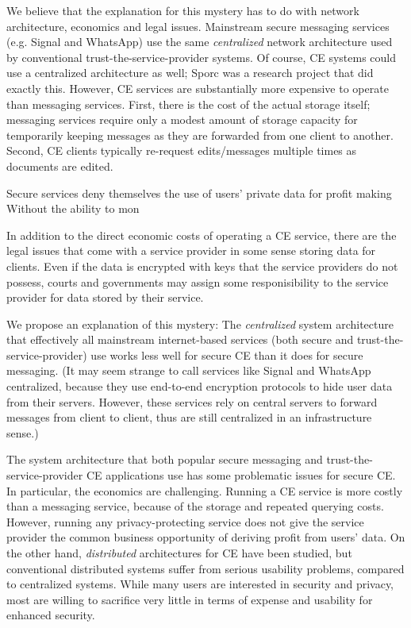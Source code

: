\documentclass[runningheads]{llncs}
\begin{document}
We believe that the explanation for this mystery has to do with network architecture, economics and legal issues.
Mainstream secure messaging services (e.g. Signal and WhatsApp) use the same \emph{centralized} network architecture used by conventional trust-the-service-provider systems.
Of course, CE systems could use a centralized architecture as well; Sporc\cite{} was a research project that did exactly this.
However, CE services are substantially more expensive to operate than messaging services.
First, there is the cost of the actual storage itself; messaging services require only a modest amount of storage capacity for temporarily keeping messages as they are forwarded from one client to another.
Second, CE clients typically re-request edits{\slash}messages multiple times as documents are edited.

Secure services deny themselves the use of users' private data for profit making
Without the ability to mon

In addition to the direct economic costs of operating a CE service, there are the legal issues that come with a service provider in some sense storing data for clients.
Even if the data is encrypted with keys that the service providers do not possess, courts and governments may assign some responisibility to the service provider for data stored by their service.

We propose an explanation of this mystery: The \emph{centralized} system architecture that effectively all mainstream internet-based services (both secure and trust-the-service-provider) use works less well for secure CE than it does for secure messaging.
(It may seem strange to call services like Signal and WhatsApp centralized, because they use end-to-end encryption protocols to hide user data from their servers.
However, these services rely on central servers to forward messages from client to client, thus are still centralized in an infrastructure sense.)

The  system architecture that both popular secure messaging and trust-the-service-provider CE applications use has some problematic issues for secure CE.
In particular, the economics are challenging.
Running a CE service is more costly than a messaging service, because of the storage and repeated querying costs.
However, running any privacy-protecting service does not give the service provider the common business opportunity of deriving profit from users' data.
On the other hand, \emph{distributed} architectures for CE have been studied, but conventional distributed systems suffer from serious usability problems, compared to centralized systems.
While many users are interested in security and privacy, most are willing to sacrifice very little in terms of expense and usability for enhanced security.
\end{document}
